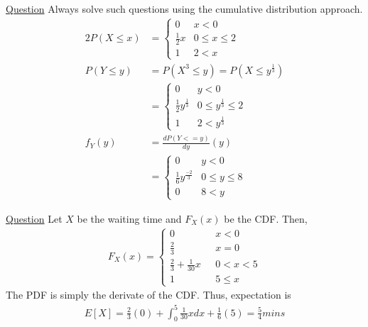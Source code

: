 \documentclass[../probability-notes.tex]{subfiles}
\begin{document}
\begin{enumerate}
        \hypertarget{a_pmffn}{\item} \hyperlink{q_pmffn}{Question}\newline
        Always solve such questions using the cumulative distribution approach.
        \begin{alignat*}{2}
            P(X \leq x) &= \begin{cases} 0 &\mbox{$x < 0$}\\
                                        \frac{1}{2} x &\mbox{$0 \leq x \leq 2$}\\
                                        1 &\mbox{$2 < x$} \end{cases}\\
            P(Y \leq y) &= P(X^{3} \leq y) = P(X \leq y^{\frac{1}{3}})\\
                        &= \begin{cases}  0 &\mbox{$y < 0$}\\
                                            \frac{1}{2} y^{\frac{1}{3}} &\mbox{$0 \leq y^{\frac{1}{3}} \leq 2$}\\
                                            1 &\mbox{$2 < y^{\frac{1}{3}}$} \end{cases}\\
            f_{Y}(y) &= \frac{dP(Y <= y)}{dy}(y)\\
                     &= \begin{cases}  0 &\mbox{$y < 0$}\\
                                            \frac{1}{6} y^{\frac{-2}{3}} &\mbox{$0 \leq y \leq 8$}\\
                                            0 &\mbox{$8 < y$} \end{cases}
        \end{alignat*}

        \hypertarget{a_waittaxi}{\item} \hyperlink{q_waittaxi}{Question}\newline
        Let $X$ be the waiting time and $F_{X}(x)$ be the CDF. Then,
        \begin{align*}
            F_{X}(x) = \begin{cases} 0 &\mbox{ $x < 0$}\\
                                    \frac{2}{3} &\mbox{ $x = 0$}\\
                                    \frac{2}{3} + \frac{1}{30}x &\mbox{ $0 < x < 5$}\\
                                    1 &\mbox{ $5 \leq x$} \end{cases}
        \end{align*}
        The PDF is simply the derivate of the CDF. Thus, expectation is
        \begin{align*}
            E[X] = \frac{2}{3}(0) + \int_{0}^{5} \frac{1}{30}x dx + \frac{1}{6}(5) = \frac{5}{4} mins
        \end{align*}


\end{enumerate}
\end{document}
